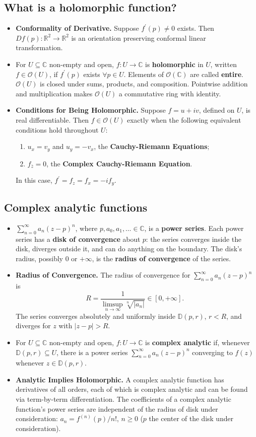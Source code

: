 \documentclass{article}
\newenvironment{topic}[1]{%
{\subsection{#1}}%
\begin{itemize}%
}{%
\end{itemize}%
}
\newcommand{\theorem}[1]{\item {\bf #1.}}
\newcommand{\corollary}[1]{\item {\bf #1.}}
\newcommand{\term}[1]{{\bf #1}}
\newcommand{\holo}[1]{\mathcal{O}(#1)}
\newcommand{\remark}{\item}
\newcommand{\entire}{\holo{\mathbb{C}}}
\newcommand{\disk}[2]{\mathbb{D}(#1, #2)}
\begin{document}
\begin{topic}{What is a holomorphic function?}
\corollary{Conformality of Derivative} Suppose $f^\prime(p) \neq 0$ exists. Then $Df(p) : \mathbb{R}^2 \to \mathbb{R}^2$ is an orientation preserving conformal linear transformation.

\remark For $U \subseteq \mathbb{C}$ non-empty and open, $f : U \to \mathbb{C}$ is \term{holomorphic} in $U$, written $f \in \holo{U}$, if $f^\prime(p)$ exists $\forall p \in U$. Elements of $\entire{}$ are called \term{entire}. $\holo{U}$ is closed under sums, products, and composition. Pointwise addition and multiplication makes $\holo{U}$ a commutative ring with identity.

\theorem{Conditions for Being Holomorphic} Suppose $f = u + iv$, defined on $U$, is real differentiable. Then $f \in \holo{U}$ exactly when the following equivalent conditions hold throughout $U$:
\begin{enumerate}
\item $u_x = v_y$ and $u_y = -v_x$, the \term{Cauchy-Riemann Equations};
\item $f_{\overline{z}} = 0$, the \term{Complex Cauchy-Riemann Equation}.
\end{enumerate}
In this case, $f^\prime = f_z = f_x = -if_y$.

\end{topic}


\begin{topic}{Complex analytic functions}

\remark $\sum_{n=0}^\infty a_n (z - p)^n$, where $p, a_0, a_1, \ldots \in \mathbb{C}$, is a \term{power series}. Each power series has a \term{disk of convergence} about $p$: the series converges inside the disk, diverges outside it, and can do anything on the boundary. The disk's radius, possibly $0$ or $+\infty$, is the \term{radius of convergence} of the series.

\theorem{Radius of Convergence} The radius of convergence for $\sum_{n=0}^\infty a_n (z - p)^n$ is $$R = \dfrac{1}{\limsup_{n \to \infty} \sqrt[n]{|a_n|}} \in [0, +\infty].$$ The series converges absolutely and uniformly inside $\disk{p}{r}$, $r < R$, and diverges for $z$ with $|z - p| > R$.

\remark For $U \subseteq \mathbb{C}$ non-empty and open, $f : U \to \mathbb{C}$ is \term{complex analytic} if, whenever $\disk{p}{r} \subseteq U$, there is a power series $\sum_{n=0}^\infty a_n (z - p)^n$ converging to $f(z)$ whenever $z \in \disk{p}{r}$.

\theorem{Analytic Implies Holomorphic} A complex analytic function has derivatives of all orders, each of which is complex analytic and can be found via term-by-term differentiation. The coefficients of a complex analytic function's power series are independent of the radius of disk under consideration: $a_n = f^{(n)}(p) / n!$, $n \geq 0$ ($p$ the center of the disk under consideration).

\end{topic}
\end{document}
